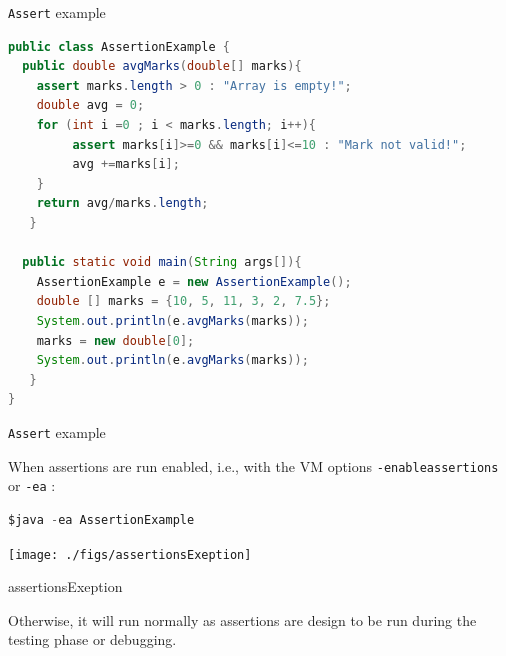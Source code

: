 \documentclass[11pt, xcolor=svgnames]{beamer}
\begin{document}

\begin{frame}[fragile]{\texttt{Assert} example}

\begin{lstlisting}[language=JAVA,basicstyle=\scriptsize]
public class AssertionExample {
  public double avgMarks(double[] marks){
   	assert marks.length > 0 : "Array is empty!";
   	double avg = 0;
   	for (int i =0 ; i < marks.length; i++){
   	     assert marks[i]>=0 && marks[i]<=10 : "Mark not valid!";
   	     avg +=marks[i];
   	}
   	return avg/marks.length;
   }

  public static void main(String args[]){
   	AssertionExample e = new AssertionExample();
   	double [] marks = {10, 5, 11, 3, 2, 7.5};
   	System.out.println(e.avgMarks(marks));
   	marks = new double[0];
   	System.out.println(e.avgMarks(marks));
   }
}
\end{lstlisting}


\end{frame}




\begin{frame}[fragile]{\texttt{Assert} example}

When assertions are run enabled, i.e., with the VM options \texttt{-enableassertions} or \texttt{-ea} :
\begin{lstlisting}[language=JAVA,basicstyle=\scriptsize]
$java -ea AssertionExample
\end{lstlisting}

\begin{center}
 \texttt{[image: ./figs/assertionsExeption]}
\end{center}

assertionsExeption 

Otherwise, it will run normally as assertions are design to be run during the testing phase or debugging.

\end{frame}

\end{document}
